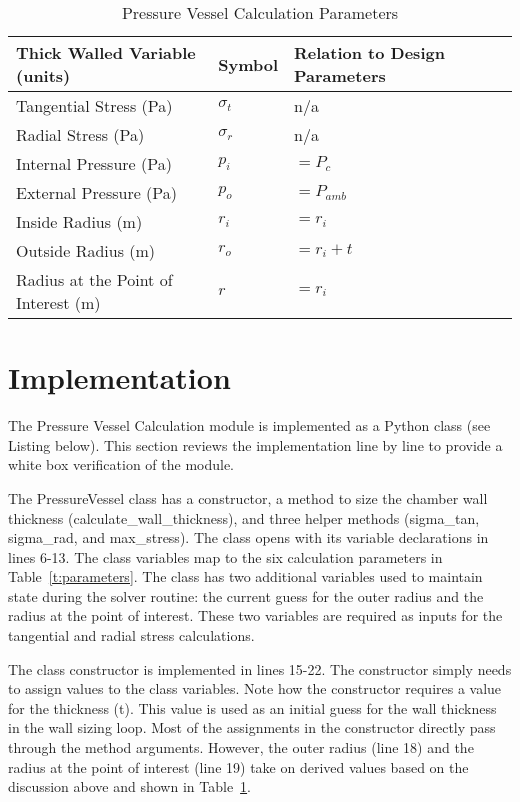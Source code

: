\documentclass{article}
\begin{document}
\begin{table}[ht!]%
  \caption{Pressure Vessel Calculation Parameters}
  \centering
  \begin{tabular}{llll}
   Thick Walled Variable (units) & Symbol & Relation to Design Parameters \\
	\hline\hline
	Tangential Stress (Pa) & $\sigma_t$ & n/a \\
	Radial Stress (Pa) & $\sigma_r$  & n/a \\
	Internal Pressure (Pa) & $p_i$ & $= P_c$\\
	External Pressure (Pa) & $p_o$ & $= P_{amb}$\\
	Inside Radius (m) & $r_i$ & $= r_i$\\
	Outside Radius (m) & $r_o$ & $= r_i + t$\\
	Radius at the Point of Interest (m) & $r$ & $= r_i$\\
	\hline
  \end{tabular}
 \label{t:parameter_mapping}
\end{table}

\section{Implementation}
The Pressure Vessel Calculation module is implemented as a Python class (see Listing below).  This section reviews the implementation line by line to provide a white box verification of the module.  

The PressureVessel class has a constructor, a method to size the chamber wall thickness (calculate\_wall\_thickness), and three helper methods (sigma\_tan, sigma\_rad, and max\_stress).  The class opens with its variable declarations in lines 6-13.  The class variables map to the six calculation parameters in Table~\ref{t:parameters}.  The class has two additional variables used to maintain state during the solver routine: the current guess for the outer radius and the radius at the point of interest.  These two variables are required as inputs for the tangential and radial stress calculations.  

The class constructor is implemented in lines 15-22.  The constructor simply needs to assign values to the class variables.  Note how the constructor requires a value for the thickness (t).  This value is used as an initial guess for the wall thickness in the wall sizing loop.  Most of the assignments in the constructor directly pass through the method arguments.  However, the outer radius (line 18) and the radius at the point of interest (line 19) take on derived values based on the discussion above and shown in Table~\ref{t:parameter_mapping}.
\end{document}
